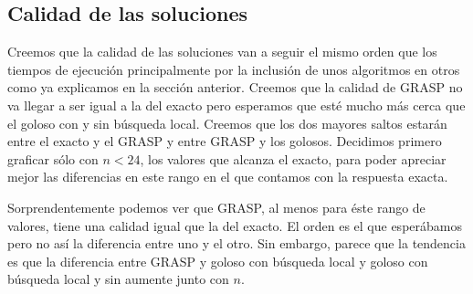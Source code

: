 \subsection{Calidad de las soluciones}
Creemos que la calidad de las soluciones van a seguir el mismo orden que los tiempos de ejecución
principalmente por la inclusión de unos algoritmos en otros como ya explicamos en la sección anterior.
Creemos que la calidad de GRASP no va llegar a ser igual a la del exacto pero esperamos
que esté mucho más cerca que el goloso con y sin búsqueda local. Creemos que los dos mayores saltos
estarán entre el exacto y el GRASP y entre GRASP y los golosos.
Decidimos primero graficar sólo con $n < 24$, los valores que alcanza el exacto, para poder apreciar
mejor las diferencias en este rango en el que contamos con la respuesta exacta.
\begin{figure}[H]
    \begin{minipage}[t]{\linewidth}
		\centering
		\label{fig:ejercicio-6-comparacion-calidad}
    \end{minipage}
\end{figure}

Sorprendentemente podemos ver que GRASP, al menos para éste rango de valores, tiene una calidad
igual que la del exacto. El orden es el que esperábamos pero no así la diferencia entre uno y el otro.
Sin embargo, parece que la tendencia es que la diferencia entre GRASP y goloso con búsqueda local y
goloso con búsqueda local y sin aumente junto con $n$.

